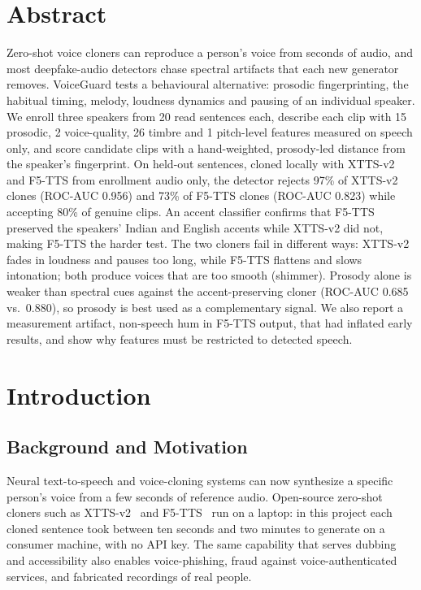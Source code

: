 \documentclass[11pt,a4paper]{article}
\begin{document}
\section*{Abstract}
Zero-shot voice cloners can reproduce a person's voice from seconds of audio, and most deepfake-audio detectors chase spectral artifacts that each new generator removes. VoiceGuard tests a behavioural alternative: prosodic fingerprinting, the habitual timing, melody, loudness dynamics and pausing of an individual speaker. We enroll three speakers from 20 read sentences each, describe each clip with 15 prosodic, 2 voice-quality, 26 timbre and 1 pitch-level features measured on speech only, and score candidate clips with a hand-weighted, prosody-led distance from the speaker's fingerprint. On held-out sentences, cloned locally with XTTS-v2 and F5-TTS from enrollment audio only, the detector rejects 97\% of XTTS-v2 clones (ROC-AUC 0.956) and 73\% of F5-TTS clones (ROC-AUC 0.823) while accepting 80\% of genuine clips. An accent classifier confirms that F5-TTS preserved the speakers' Indian and English accents while XTTS-v2 did not, making F5-TTS the harder test. The two cloners fail in different ways: XTTS-v2 fades in loudness and pauses too long, while F5-TTS flattens and slows intonation; both produce voices that are too smooth (shimmer). Prosody alone is weaker than spectral cues against the accent-preserving cloner (ROC-AUC 0.685 vs.\ 0.880), so prosody is best used as a complementary signal. We also report a measurement artifact, non-speech hum in F5-TTS output, that had inflated early results, and show why features must be restricted to detected speech.

\clearpage
\section{Introduction}

\subsection{Background and Motivation}
Neural text-to-speech and voice-cloning systems can now synthesize a specific person's voice from a few seconds of reference audio. Open-source zero-shot cloners such as XTTS-v2~\cite{xtts} and F5-TTS~\cite{f5tts} run on a laptop: in this project each cloned sentence took between ten seconds and two minutes to generate on a consumer machine, with no API key. The same capability that serves dubbing and accessibility also enables voice-phishing, fraud against voice-authenticated services, and fabricated recordings of real people.
\end{document}

